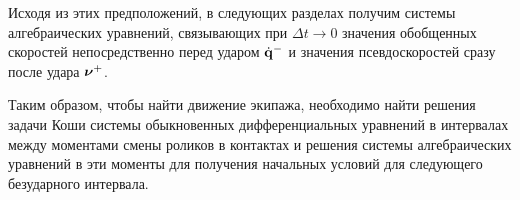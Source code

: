 
Исходя из этих предположений, в следующих разделах получим системы алгебраических уравнений, связывающих при $\Delta t \rightarrow 0$ значения обобщенных скоростей непосредственно перед ударом $\dot{\mathbf{q}}^-$ и значения псевдоскоростей сразу после удара $\boldsymbol{\mathbf{\nu}}^+$.

Таким образом, чтобы найти движение экипажа, необходимо найти решения задачи Коши системы обыкновенных дифференциальных уравнений в интервалах между моментами смены роликов в контактах и решения системы алгебраических уравнений в эти моменты для получения начальных условий для следующего безударного интервала.
